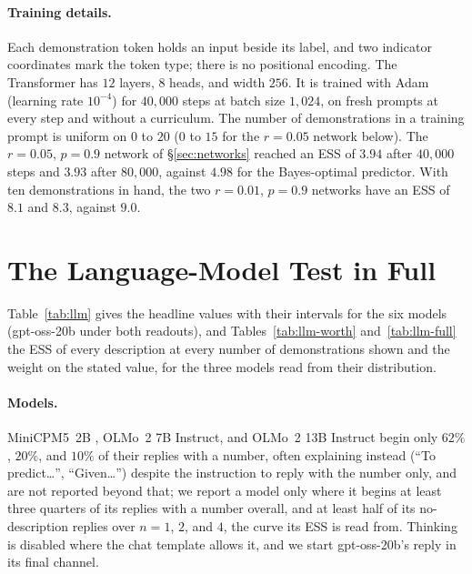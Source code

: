 \documentclass{article}
\begin{document}
\paragraph{Training details.} Each demonstration token holds an input beside its label, and two indicator coordinates mark the token type; there is no positional encoding. The Transformer has $12$ layers, $8$ heads, and width $256$. It is trained with Adam (learning rate $10^{-4}$) for $40{,}000$ steps at batch size $1{,}024$, on fresh prompts at every step and without a curriculum. The number of demonstrations in a training prompt is uniform on $0$ to $20$ ($0$ to $15$ for the $r = 0.05$ network below). The $r = 0.05$, $p = 0.9$ network of \S\ref{sec:networks} reached an ESS of $3.94$ after $40{,}000$ steps and $3.93$ after $80{,}000$, against $4.98$ for the Bayes-optimal predictor. With ten demonstrations in hand, the two $r = 0.01$, $p = 0.9$ networks have an ESS of $8.1$ and $8.3$, against $9.0$.

\section{The Language-Model Test in Full}\label{app:llm}
Table~\ref{tab:llm} gives the headline values with their intervals for the six models (gpt-oss-20b under both readouts), and Tables~\ref{tab:llm-worth} and~\ref{tab:llm-full} the ESS of every description at every number of demonstrations shown and the weight on the stated value, for the three models read from their distribution.

\paragraph{Models.} MiniCPM5~2B \citep{minicpm5}, OLMo~2 7B Instruct, and OLMo~2 13B Instruct begin only $62\%$, $20\%$, and $10\%$ of their replies with a number, often explaining instead (``To predict\ldots'', ``Given\ldots'') despite the instruction to reply with the number only, and are not reported beyond that; we report a model only where it begins at least three quarters of its replies with a number overall, and at least half of its no-description replies over $n = 1$, $2$, and $4$, the curve its ESS is read from. Thinking is disabled where the chat template allows it, and we start gpt-oss-20b's reply in its final channel.
\end{document}
